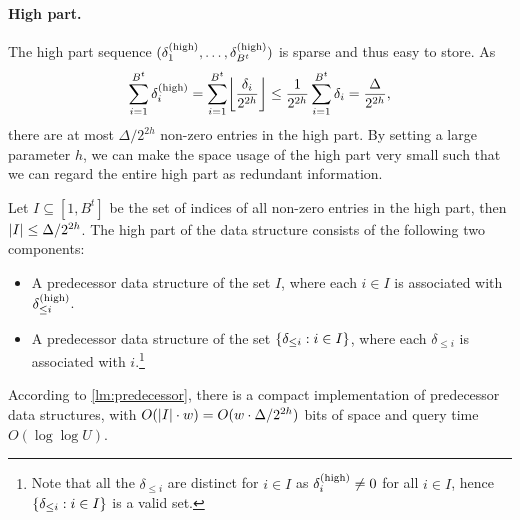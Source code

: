 \documentclass{article}
\theoremstyle{plain}
\theoremstyle{definition}  \newtheorem{definition}[theorem]{Definition}
\DeclarePairedDelimiter{\floor}{\lfloor}{\rfloor}
\DeclarePairedDelimiter{\bk}{(}{)}
\DeclarePairedDelimiter{\BK}{\{}{\}}
\DeclarePairedDelimiter{\abs}{\lvert}{\rvert}
\newcommand{\deltahigh}[1][i]{\delta_{#1}^{(\textup{high})}}
\begin{document}
\paragraph*{High part.}
The high part sequence $\bk{\deltahigh[1], \ldots, \deltahigh[B^t]}$ is sparse and thus easy to store. As
\begin{align*}
    \sum_{i=1}^{B^t} \deltahigh = \sum_{i=1}^{B^t} \floor*{\frac{\delta_i}{2^{2h}}} \le \frac{1}{2^{2h}} \sum_{i=1}^{B^t} \delta_i = \frac{\Delta}{2^{2h}},
\end{align*}
there are at most $\Delta/2^{2h}$ non-zero entries in the high part. 
By setting a large parameter $h$, we can make the space usage of the high part very small such that we can regard the entire high part as redundant information.

Let $I \subseteq [1, B^t]$ be the set of indices of all non-zero entries in the high part, then $\abs{I} \le \Delta/2^{2h}$. The high part of the data structure consists of the following two components: 
\begin{itemize}
\item A predecessor data structure of the set $I$, where each $i \in I$ is associated with $\deltahigh[\le i]$. 
\item A predecessor data structure of the set $\BK{\delta_{\le i} : i\in I}$, where each $\delta_{\le i}$ is associated with $i$.\footnote{Note that all the $\delta_{\le i}$ are distinct for $i \in I$ as $\deltahigh \neq 0$ for all $i \in I$, hence $\BK{\delta_{\le i} : i\in I}$ is a valid set.}
\end{itemize}
According to \cref{lm:predecessor}, there is a compact implementation of predecessor data structures, with $O(\abs{I} \cdot w) = O(w \cdot \Delta / 2^{2h})$ bits of space and query time $O(\log \log U)$.
\end{document}
